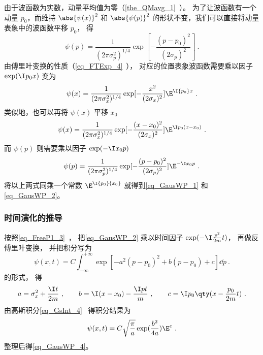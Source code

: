 由于波函数为实数，动量平均值为零（\autoref{the_QMavg_1}~）。 为了让波函数有一个动量 $p_0$，而维持 $\abs{\psi(x)}^2$ 和 $\abs{\psi(p)}^2$ %
的形状不变，我们可以直接将动量表象中的波函数平移 $p_0$， 得
\begin{equation}
\psi (p) = \frac{1}{(2\pi\sigma_p^2)^{1/4}} \exp[-\frac{(p - p_0)^2}{(2\sigma_p)^2}]~.
\end{equation}
由傅里叶变换的性质（\autoref{eq_FTExp_4}~）， 对应的位置表象波函数需要乘以因子 $\exp(\I p_0 x)$ 变为
\begin{equation}
\psi(x) = \frac{1}{(2\pi\sigma_x^2)^{1/4}} \exp[-\frac{x^2}{(2\sigma_x)^2}] {\E^{\I {p_0}x}}~.
\end{equation}
类似地，也可以再将 $\psi(x)$ 平移 $x_0$ 
\begin{equation}
\psi (x) = \frac{1}{(2\pi\sigma_x^2)^{1/4}} \exp[-\frac{(x-x_0)^2}{(2\sigma_x)^2}] \E^{\I p_0 (x-x_0)}~.
\end{equation}
而 $\psi(p)$ 则需要乘以因子 $\exp (-\I x_0 p)$
\begin{equation}\label{eq_GausWP_3}
\psi(p) = \frac{1}{(2\pi\sigma_p^2)^{1/4}} \exp[-\frac{(p - p_0)^2}{(2\sigma_p)^2}] \E^{-\I x_0 p}~.
\end{equation}
将以上两式同乘一个常数%
 ${\E^{\I{p_0}{x_0}}}$ 就得到\autoref{eq_GausWP_1} 和\autoref{eq_GausWP_2}。

\subsubsection{时间演化的推导}
按照\autoref{eq_FreeP1_3}~， 把\autoref{eq_GausWP_2} 乘以时间因子 $\exp(-\I \frac{p^2}{2m}t)$， 再做反傅里叶变换， 并把积分写为
\begin{equation}
\psi(x, t) = C\int_{-\infty}^{+\infty} \exp[-a^2(p-p_0)^2 + b(p-p_0) + c] \dd{p}~.
\end{equation}
的形式， 得
\begin{equation}
a = \sigma_x^2 + \frac{\I t}{2m}~, \qquad
b = \I(x-x_0) - \frac{\I pt}{m}~, \qquad
c = \I p_0 \qty(x - \frac{p_0}{2m} t)~.
\end{equation}
由高斯积分\autoref{eq_GsInt_4}~ 得积分结果为
\begin{equation}
\psi(x, t) = C\sqrt{\frac{\pi}{a}} \exp(\frac{b^2}{4a})\E^c~.
\end{equation}
整理后得\autoref{eq_GausWP_4}。
